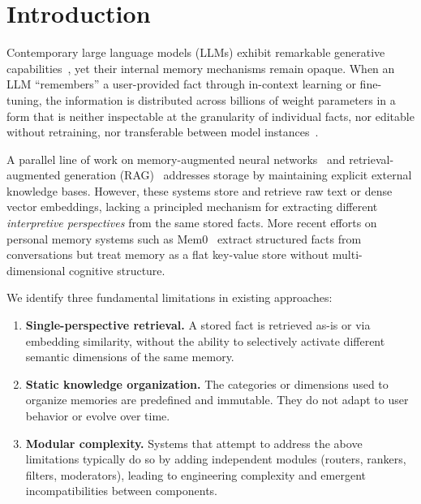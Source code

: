 \documentclass[review]{elsarticle}
\begin{document}
\section{Introduction}

Contemporary large language models (LLMs) exhibit remarkable generative
capabilities~\cite{bommasani2021opportunities}, yet their internal memory
mechanisms remain opaque. When an LLM ``remembers'' a user-provided fact
through in-context learning or fine-tuning, the information is distributed
across billions of weight parameters in a form that is neither inspectable
at the granularity of individual facts, nor editable without retraining,
nor transferable between model instances~\cite{bender2021dangers}.

A parallel line of work on memory-augmented neural networks~\cite{graves2014neural,
graves2016hybrid,weston2014memory} and retrieval-augmented generation
(RAG)~\cite{lewis2020retrieval,karpukhin2020dense} addresses storage by
maintaining explicit external knowledge bases. However, these systems store
and retrieve raw text or dense vector embeddings, lacking a principled
mechanism for extracting different \emph{interpretive perspectives} from
the same stored facts. More recent efforts on personal memory systems such
as Mem0~\cite{mem0} extract structured facts from conversations but treat
memory as a flat key-value store without multi-dimensional cognitive structure.

We identify three fundamental limitations in existing approaches:
\begin{enumerate}[leftmargin=*,itemsep=0pt]
\item \textbf{Single-perspective retrieval.} A stored fact is retrieved as-is
  or via embedding similarity, without the ability to selectively activate
  different semantic dimensions of the same memory.
\item \textbf{Static knowledge organization.} The categories or dimensions
  used to organize memories are predefined and immutable. They do not
  adapt to user behavior or evolve over time.
\item \textbf{Modular complexity.} Systems that attempt to address the
  above limitations typically do so by adding independent modules
  (routers, rankers, filters, moderators), leading to engineering
  complexity and emergent incompatibilities between components.
\end{enumerate}
\end{document}
